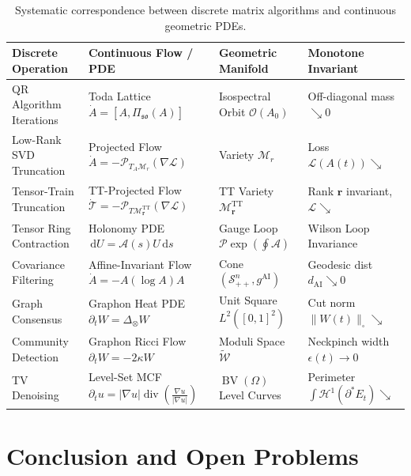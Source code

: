 \documentclass[11pt,a4paper,reqno]{amsart}
\theoremstyle{definition}
\numberwithin{equation}{section}
\newcommand{\BV}{\operatorname{BV}}
\newcommand{\cutnorm}[1]{\|#1\|_{\square}}
\newcommand{\dif}{\,\mathrm{d}}
\begin{document}
\begin{table}[htbp]
\centering
\scriptsize
\renewcommand{\arraystretch}{1.3}
\begin{tabular}{@{}llll@{}}
\toprule
\textbf{Discrete Operation} & \textbf{Continuous Flow / PDE} & \textbf{Geometric Manifold} & \textbf{Monotone Invariant} \\
\midrule
QR Algorithm Iterations & Toda Lattice $\dot{A} = [A, \Pi_{\mathfrak{so}}(A)]$ & Isospectral Orbit $\mathcal{O}(A_0)$ & Off-diagonal mass $\searrow 0$ \\
Low-Rank SVD Truncation & Projected Flow $\dot{A} = -\mathcal{P}_{T_A \mathcal{M}_r}(\nabla \mathcal{L})$ & Variety $\mathcal{M}_r$ & Loss $\mathcal{L}(A(t)) \searrow$ \\
Tensor-Train Truncation & TT-Projected Flow $\dot{\mathcal{T}} = -\mathcal{P}_{T \mathcal{M}_{\mathbf{r}}^{\mathrm{TT}}}(\nabla \mathcal{L})$ & TT Variety $\mathcal{M}_{\mathbf{r}}^{\mathrm{TT}}$ & Rank $\mathbf{r}$ invariant, $\mathcal{L} \searrow$ \\
Tensor Ring Contraction & Holonomy PDE $\dif U = \mathcal{A}(s) U \dif s$ & Gauge Loop $\mathcal{P} \exp(\oint \mathcal{A})$ & Wilson Loop Invariance \\
Covariance Filtering & Affine-Invariant Flow $\dot{A} = -A (\log A) A$ & Cone $(\mathcal{S}_{++}^n, g^{\mathrm{AI}})$ & Geodesic dist $d_{\mathrm{AI}} \searrow 0$ \\
Graph Consensus & Graphon Heat PDE $\partial_t W = \Delta_\otimes W$ & Unit Square $L^2([0,1]^2)$ & Cut norm $\cutnorm{W(t)} \searrow$ \\
Community Detection & Graphon Ricci Flow $\partial_t W = -2\kappa W$ & Moduli Space $\widetilde{\mathcal{W}}$ & Neckpinch width $\epsilon(t) \to 0$ \\
TV Denoising & Level-Set MCF $\partial_t u = |\nabla u| \operatorname{div}(\frac{\nabla u}{|\nabla u|})$ & $\BV(\Omega)$ Level Curves & Perimeter $\int \mathcal{H}^1(\partial^* E_t) \searrow$ \\
\bottomrule
\end{tabular}
\caption{Systematic correspondence between discrete matrix algorithms and continuous geometric PDEs.}
\label{tab:flows_comparison}
\end{table}

\section{Conclusion and Open Problems}
\label{sec:conclusion}
\end{document}
